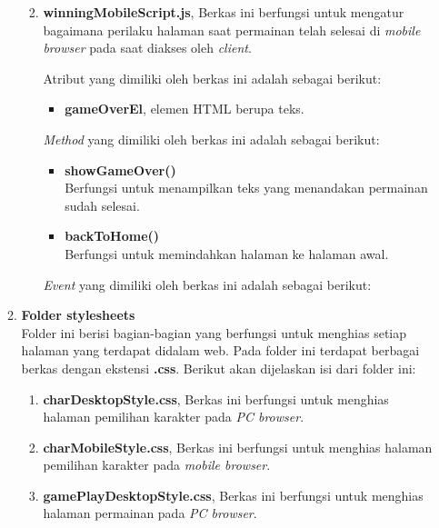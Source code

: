 \begin{enumerate}
\begin{enumerate}
\begin{enumerate}
\begin{itemize}
			\end{itemize}
			
			\item \textbf{winningMobileScript.js}, Berkas ini berfungsi untuk mengatur bagaimana perilaku halaman saat permainan telah selesai di \textit{mobile browser} pada saat diakses oleh \textit{client}.
			
			Atribut yang dimiliki oleh berkas ini adalah sebagai berikut:
			\begin{itemize}
				\item \textbf{gameOverEl}, elemen HTML berupa teks.
			\end{itemize}
			
			\textit{Method} yang dimiliki oleh berkas ini adalah sebagai berikut:
			\begin{itemize}
				\item \textbf{showGameOver()} \\
				Berfungsi untuk menampilkan teks yang menandakan permainan sudah selesai.
				
				\item \textbf{backToHome()} \\
				Berfungsi untuk memindahkan halaman ke halaman awal.
			\end{itemize}
			
			\textit{Event} yang dimiliki oleh berkas ini adalah sebagai berikut:
			
		\end{enumerate}
		\item \textbf{Folder stylesheets} \\ 
		Folder ini berisi bagian-bagian yang berfungsi untuk menghias setiap halaman yang terdapat didalam web. Pada folder ini terdapat berbagai berkas dengan ekstensi \textbf{.css}. Berikut akan dijelaskan isi dari folder ini:
		
		\begin{enumerate}
			\item \textbf{charDesktopStyle.css}, Berkas ini berfungsi untuk menghias halaman pemilihan karakter pada \textit{PC browser}.
			
			\item \textbf{charMobileStyle.css}, Berkas ini berfungsi untuk menghias halaman pemilihan karakter pada \textit{mobile browser}.
			
			\item \textbf{gamePlayDesktopStyle.css}, Berkas ini berfungsi untuk menghias halaman permainan pada \textit{PC browser}.
			

\end{enumerate}
\end{enumerate}
\end{enumerate}
